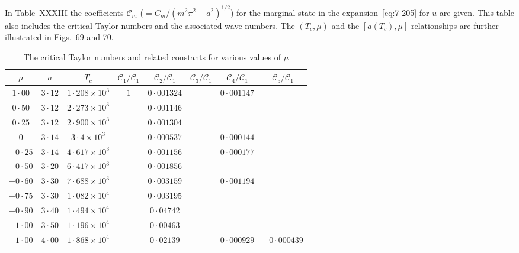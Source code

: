 

In Table~XXXIII the coefficients $\mathscr{C}_m$ ($= C_m/(m^2\pi^2+a^2)^{1/2}$) for the marginal state in the expansion~\eqref{eq:7-205} for $u$ are given.  This table also includes
the critical Taylor numbers and the associated wave numbers.  The
$(T_c, \mu)$ and the $[a(T_c), \mu]$-relationships are further illustrated in Figs.~69
and 70.

\begin{table}[htbp]
\centering
\caption{The critical Taylor numbers and related constants for various values of $\mu$}
\label{tab:XXXIII}
\small
\begin{tabular}{cccccccc}
\hline
$\mu$ & $a$ & $T_c$ & $\mathscr{C}_1/\mathscr{C}_1$ & $\mathscr{C}_2/\mathscr{C}_1$ & $\mathscr{C}_3/\mathscr{C}_1$ & $\mathscr{C}_4/\mathscr{C}_1$ & $\mathscr{C}_5/\mathscr{C}_1$ \\
\hline
$1{\cdot}00$ & $3{\cdot}12$ & $1{\cdot}208\times 10^3$ & $1$ & $0{\cdot}001324$ & & $0{\cdot}001147$ & \\
$0{\cdot}50$ & $3{\cdot}12$ & $2{\cdot}273\times 10^3$ & & $0{\cdot}001146$ & & & \\
$0{\cdot}25$ & $3{\cdot}12$ & $2{\cdot}900\times 10^3$ & & $0{\cdot}001304$ & & & \\
$0$ & $3{\cdot}14$ & $3{\cdot}4 \times 10^3$ & & $0{\cdot}000537$ & & $0{\cdot}000144$ & \\
$-0{\cdot}25$ & $3{\cdot}14$ & $4{\cdot}617\times 10^3$ & & $0{\cdot}001156$ & & $0{\cdot}000177$ & \\
$-0{\cdot}50$ & $3{\cdot}20$ & $6{\cdot}417\times 10^3$ & & $0{\cdot}001856$ & & & \\
$-0{\cdot}60$ & $3{\cdot}30$ & $7{\cdot}688\times 10^3$ & & $0{\cdot}003159$ & & $0{\cdot}001194$ & \\
$-0{\cdot}75$ & $3{\cdot}30$ & $1{\cdot}082\times 10^4$ & & $0{\cdot}003195$ & & & \\
$-0{\cdot}90$ & $3{\cdot}40$ & $1{\cdot}494\times 10^4$ & & $0{\cdot}04742$ & & & \\
$-1{\cdot}00$ & $3{\cdot}50$ & $1{\cdot}196\times 10^4$ & & $0{\cdot}00463$ & & & \\
$-1{\cdot}00$ & $4{\cdot}00$ & $1{\cdot}868\times 10^4$ & & $0{\cdot}02139$ & & $0{\cdot}000929$ & $-0{\cdot}000439$ \\

\end{tabular}
\end{table}
